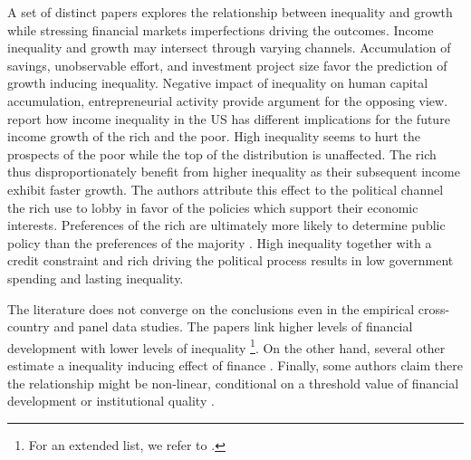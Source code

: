 \begin{refsection}
A set of distinct papers explores the relationship between inequality and growth while stressing financial markets imperfections driving the outcomes. Income inequality and growth may intersect through varying channels. Accumulation of savings, unobservable effort, and investment project size favor the prediction of growth inducing inequality. Negative impact of inequality on human capital accumulation, entrepreneurial activity provide argument for the opposing view. 
\textcite{milanovicvan2018inequality} report how income inequality in the \ac{US} has different implications for the future income growth of the rich and the poor. High inequality seems to hurt the prospects of the poor while the top of the distribution is unaffected. The rich thus disproportionately benefit from higher inequality as their subsequent income exhibit faster growth. The authors attribute this effect to the political channel the rich use to lobby in favor of the policies which support their economic interests. Preferences of the rich are ultimately more likely to determine public policy than the preferences of the majority \parencite{gilens_page_2014}. High inequality together with a credit constraint and rich driving the political process results in low government spending and lasting inequality.

The literature does not converge on the conclusions even in the empirical cross-country and panel data studies. The papers link higher levels of financial development with lower levels of inequality \parencite{beck2007finance, hamori2012, gimet2011closer, kunieda2014finance}\footnote{For an extended list, we refer to \textcite{de2017finance}.}. On the other hand, several other estimate a inequality inducing effect of finance \parencite{Jaumotte2013, jauch2016financial, de2017finance}. Finally, some authors claim there the relationship might be non-linear, conditional on a threshold value of financial development \parencite{kim2011nonlinearity,tan2012nonlinear} or institutional quality \parencite{LawSingh2014, delis2014}.


\end{refsection}
